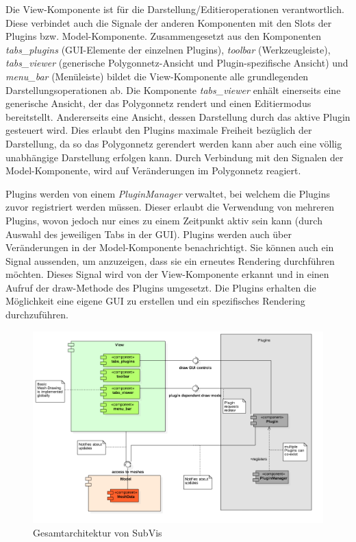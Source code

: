 Die View-Komponente ist für die Darstellung/Editieroperationen verantwortlich.
Diese verbindet auch die Signale der anderen Komponenten mit den Slots der Plugins bzw. Model-Komponente.
Zusammengesetzt aus den Komponenten \emph{tabs\_plugins} (GUI-Elemente der einzelnen Plugins), \emph{toolbar} (Werkzeugleiste), \emph{tabs\_viewer} (generische Polygonnetz-Ansicht und Plugin-spezifische Ansicht) und \emph{menu\_bar} (Menüleiste) bildet die View-Komponente alle grundlegenden Darstellungsoperationen ab.
Die Komponente \emph{tabs\_viewer} enhält einerseits eine generische Ansicht, der das Polygonnetz rendert und einen Editiermodus bereitstellt. 
Andererseits eine Ansicht, dessen Darstellung durch das aktive Plugin gesteuert wird.
Dies erlaubt den Plugins maximale Freiheit bezüglich der Darstellung, da so das Polygonnetz gerendert werden kann aber auch eine völlig unabhängige Darstellung erfolgen kann.
Durch Verbindung mit den Signalen der Model-Komponente, wird auf Veränderungen im Polygonnetz reagiert.

Plugins werden von einem \emph{PluginManager} verwaltet, bei welchem die Plugins zuvor registriert werden müssen.
Dieser erlaubt die Verwendung von mehreren Plugins, wovon jedoch nur eines zu einem Zeitpunkt aktiv sein kann (durch Auswahl des jeweiligen Tabs in der GUI).
Plugins werden auch über Veränderungen in der Model-Komponente benachrichtigt.
Sie können auch ein Signal aussenden, um anzuzeigen, dass sie ein erneutes Rendering durchführen möchten.
Dieses Signal wird von der View-Komponente erkannt und in einen Aufruf der draw-Methode des Plugins umgesetzt.
Die Plugins erhalten die Möglichkeit eine eigene GUI zu erstellen und ein spezifisches Rendering durchzuführen.

\begin{figure}
  \centering
  \includegraphics[width=\textwidth]{content/media/subvis_architektur.png}
  \caption{Gesamtarchitektur von SubVis}
  \label{fig:subvis_architektur}
\end{figure}


